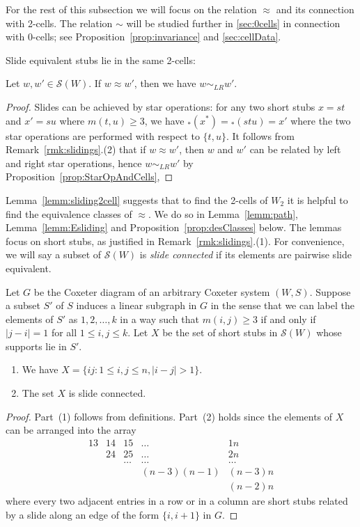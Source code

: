 \documentclass[ALCO,Unicode,published]{cedram}
\newcommand{\sw}{\mathcal{S}(W)}
\newcommand{\abs}[1]{\lvert #1 \rvert}
\begin{document}
For the rest of this subsection we will focus on the relation $\approx$ and its connection with
2-cells. The relation $\sim$ will be studied further in \autoref{sec:0cells} in connection with
0-cells; see Proposition~\ref{prop:invariance} and \autoref{sec:cellData}. 


Slide equivalent stubs lie in the same 2-cells:

\begin{lemma}
\label{lemm:sliding2cell}
    Let $w,w'\in \sw$. If $w\approx w'$, then we have $w\sim_{LR} w'$. 
\end{lemma}

\begin{proof}
    Slides can be achieved by star operations: for any two short stubs $x=st$ and $x'=su$ where
    $m(t,u)\ge 3$, we have ${}_*(x^*)={}_* (stu)=x'$ where the two star operations are performed
    with respect to $\{t,u\}$. It follows from Remark~\ref{rmk:slidings}.(2) that if $w\approx w'$, then
    $w$ and $w'$ can be related by left and right star operations, hence $w\sim_{LR} w'$ by
    Proposition~\ref{prop:StarOpAndCells},
\end{proof}

Lemma~\ref{lemm:sliding2cell} suggests that to find the 2-cells of $W_2$ it is helpful to find the
equivalence classes of $\approx$. We do so in Lemma~\ref{lemm:path}, Lemma~\ref{lemm:Esliding} and
Proposition~\ref{prop:desClasses} below. The lemmas focus on short stubs, as justified in
Remark~\ref{rmk:slidings}.(1). For convenience, we will say a subset of $\sw$ is \emph{slide connected} if
its elements are pairwise slide equivalent.

\begin{lemma}
    \label{lemm:path}
    Let $G$ be the Coxeter diagram of an arbitrary Coxeter system $(W,S)$. Suppose a subset $S'$ of
    $S$ induces a linear subgraph in $G$ in the sense that we can label the elements of $S'$ as
    $1,2,\dots, k$ in a way such that $m(i,{j})\ge 3$ if and only if $\abs{j-i}=1$ for all $1\le
    i,j\le k$.  Let $X$ be the set of short stubs in $\sw$ whose supports lie in $S'$. 
    \begin{enumerate}
        \item We have $X= \{{i}j: 1\le i,j\le n, \abs{i-j}>1\}$.
        \item The set $X$ is slide connected.
    \end{enumerate}
\end{lemma}
\begin{proof} Part~(1) follows from definitions. Part~(2) holds since the elements of $X$ can be
      arranged into the array \[
        \begin{matrix} 13 & 14 & 15 & \dots & 1n\\ & 24 & 25 & \dots & 2n\\ &&\dots &\dots&\dots\\
              &&&(n-3)(n-1)& (n-3)n\\ &&&& (n-2)n
        \end{matrix} \] where every two adjacent entries in a row or in a column are short stubs
            related by a slide along an edge of the form $\{i,i+1\}$ in $G$.
\end{proof}
\end{document}
